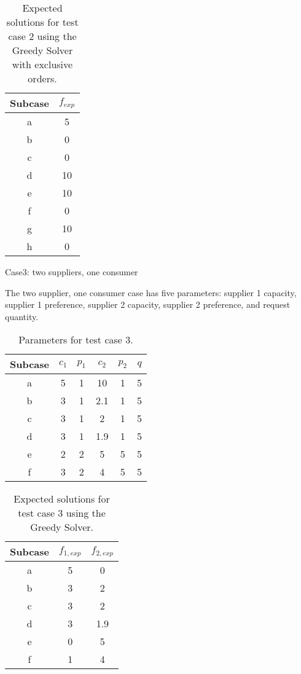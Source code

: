 \begin{table}[ht]
  \begin{center}
    \caption{Expected solutions for test case 2 using the Greedy Solver with 
      exclusive orders.}
    \begin{tabular}{cc}
    \toprule
    Subcase & $f_{exp}$\\
    \midrule
    a & 5  \\
    b & 0  \\
    c & 0  \\
    d & 10 \\
    e & 10 \\
    f & 0  \\
    g & 10 \\
    h & 0  \\
    \bottomrule
    \end{tabular}
  \end{center}
\end{table}

Case3: two suppliers, one consumer

The two supplier, one consumer case has five parameters: supplier 1 capacity,
supplier 1 preference, supplier 2 capacity, supplier 2 preference, and request
quantity.

\begin{table}[ht]
  \begin{center}
    \caption{Parameters for test case 3.}
    \begin{tabular}{cccccc}
    \toprule
    Subcase & $c_1$ & $p_1$ & $c_2$ & $p_2$ & $q$ \\
    \midrule
    a & 5  & 1   & 10  & 1   & 5  \\
    b & 3  & 1   & 2.1 & 1   & 5  \\
    c & 3  & 1   & 2   & 1   & 5  \\
    d & 3  & 1   & 1.9 & 1   & 5  \\
    e & 2  & 2   & 5   & 5   & 5  \\
    f & 3  & 2   & 4   & 5   & 5  \\
    \bottomrule
    \end{tabular}
  \end{center}
\end{table}

\begin{table}[ht]
  \begin{center}
    \caption{Expected solutions for test case 3 using the Greedy Solver.}
    \begin{tabular}{ccc}
    \toprule
    Subcase & $f_{1, exp}$ & $f_{2, exp}$\\
    \midrule
    a & 5  & 0   \\
    b & 3  & 2   \\
    c & 3  & 2   \\
    d & 3  & 1.9 \\
    e & 0  & 5   \\
    f & 1  & 4   \\
    \bottomrule
    \end{tabular}
  \end{center}
\end{table}

